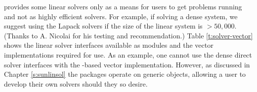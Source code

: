 {\sundials} provides some linear solvers only as a means for 
users to get problems running and not as highly efficient solvers.
For example, if solving a dense system, we suggest using the Lapack solvers
if the size of the linear system is $> 50,000$. (Thanks to A. Nicolai for 
his testing and recommendation.)
Table \ref{t:solver-vector} shows the linear solver interfaces
available as {\sunlinsol} modules and the vector implementations
required for use.  As an example, one cannot use the dense direct
solver interfaces with the {\mpi}-based vector implementation.  However,
as discussed in Chapter \ref{s:sunlinsol} the {\sundials} packages
operate on generic {\sunlinsol} objects, allowing a user to develop  
their own solvers should they so desire.  

\begin{table}[htb]
  \centering
    \caption{{\sundials} linear solver interfaces and vector 
             implementations that can be used for each.}
    \medskip
\end{table}
